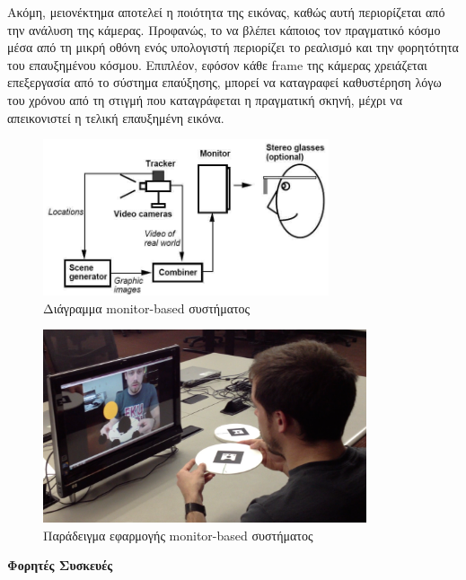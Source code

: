 Ακόμη, μειονέκτημα αποτελεί η ποιότητα της εικόνας, καθώς αυτή περιορίζεται από την ανάλυση της κάμερας. Προφανώς, το να βλέπει κάποιος τον πραγματικό κόσμο μέσα από τη μικρή οθόνη ενός υπολογιστή περιορίζει το ρεαλισμό και την φορητότητα του επαυξημένου κόσμου. Επιπλέον, εφόσον κάθε frame της κάμερας χρειάζεται επεξεργασία από το σύστημα επαύξησης, μπορεί να καταγραφεί καθυστέρηση λόγω του χρόνου από τη στιγμή που καταγράφεται η πραγματική σκηνή, μέχρι να απεικονιστεί η τελική επαυξημένη εικόνα. 




\begin{figure}[H]
    \centering
    \includegraphics[width=0.75\textwidth]{Files/Figures/monitor.jpg}
    \caption[Διάγραμμα Monitor-based συστήματος ]{ Διάγραμμα monitor-based συστήματος \cite{azuma1997}}
    \label{fig:monitor}
\end{figure}


\begin{figure}[H]
    \centering
    \includegraphics[width=0.85\textwidth]{Files/Figures/monitor_example.png}
    \caption[Παράδειγμα εφαρμογής Monitor-based συστήματος ]{ Παράδειγμα εφαρμογής monitor-based συστήματος \cite{monitor_ar}}
    \label{fig:monitor_example}
\end{figure}


\textbf{Φορητές Συσκευές}


